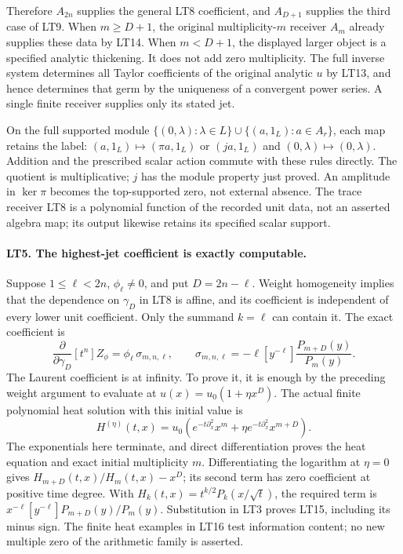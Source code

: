 Therefore $A_{2n}$ supplies the general LT8 coefficient, and
$A_{D+1}$ supplies the third case of LT9. When $m\ge D+1$,
the original multiplicity-$m$ receiver $A_m$ already supplies
these data by LT14. When $m<D+1$, the displayed larger object
is a specified analytic thickening. It does not add zero
multiplicity. The full inverse system determines all Taylor
coefficients of the original analytic $u$ by LT13, and hence
determines that germ by the uniqueness of a convergent power
series. A single finite receiver supplies only its stated jet.

On the full supported module
$\{(0,\lambda):\lambda\in L\}\cup\{(a,1_L):a\in A_r\}$,
each map retains the label:
$(a,1_L)\mapsto(\pi a,1_L)$ or $(ja,1_L)$ and
$(0,\lambda)\mapsto(0,\lambda)$. Addition and the prescribed
scalar action commute with these rules directly. The quotient
is multiplicative; $j$ has the module property just proved.
An amplitude in $\ker\pi$ becomes the top-supported zero, not
external absence. The trace receiver LT8 is a polynomial
function of the recorded unit data, not an asserted algebra map;
its output likewise retains its specified scalar support.

\paragraph{LT5. The highest-jet coefficient is exactly computable.}
Suppose $1\le\ell<2n$, $\phi_\ell\ne0$, and put $D=2n-\ell$.
Weight homogeneity implies that the dependence on $\gamma_D$
in LT8 is affine, and its coefficient is independent of every
lower unit coefficient. Only the summand $k=\ell$ can contain it.
The exact coefficient is
\[
 \boxed{\frac{\partial}{\partial\gamma_D}[t^n]Z_\phi
       =\phi_\ell\,\sigma_{m,n,\ell},\qquad
 \sigma_{m,n,\ell}
       =-\ell[y^{-\ell}]\frac{P_{m+D}(y)}{P_m(y)}.}
 \tag{LT15}
\]
The Laurent coefficient is at infinity. To prove it, it is
enough by the preceding weight argument to evaluate at
$u(x)=u_0(1+\eta x^D)$. The actual finite polynomial heat
solution with this initial value is
\[
 H^{(\eta)}(t,x)=u_0\left(
 e^{-t\partial_x^2}x^m+\eta e^{-t\partial_x^2}x^{m+D}\right).
 \tag{LT16}
\]
The exponentials here terminate, and direct differentiation proves
the heat equation and exact initial multiplicity $m$.
Differentiating the logarithm at $\eta=0$ gives
$H_{m+D}(t,x)/H_m(t,x)-x^D$; its second term has zero
coefficient at positive time degree. With
$H_k(t,x)=t^{k/2}P_k(x/\sqrt t)$, the required term is
$x^{-\ell}[y^{-\ell}]P_{m+D}(y)/P_m(y)$.
Substitution in LT3 proves LT15, including its minus sign.
The finite heat examples in LT16 test information content; no
new multiple zero of the arithmetic family is asserted.

